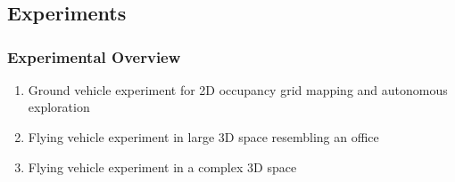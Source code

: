 \documentclass[11pt,professionalfonts,hyperref={pdftex,pdfpagemode=none,pdfstartview=FitH}]{beamer}
\begin{document}
\section*{}
\subsection*{Experiments}

\begin{frame}
\frametitle{Experimental Overview}

\begin{enumerate}
	\item Ground vehicle experiment for 2D occupancy grid mapping and autonomous exploration
	\item Flying vehicle experiment in large 3D space resembling an office
	\item Flying vehicle experiment in a complex 3D space
\end{enumerate}
\end{frame}
\end{document}
